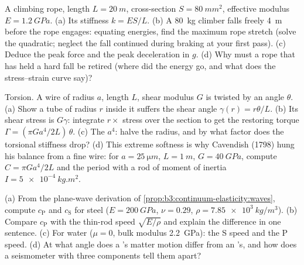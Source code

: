 \begin{exercise}[$\star\star$]\label{exo:b3:continuum-elasticity:7}
A climbing rope, length $L = \qty{20}{m}$, cross-section $S =
\qty{80}{mm^2}$, effective modulus $E = \qty{1.2}{GPa}$. (a) Its
stiffness $k = ES/L$. (b) A \qty{80}{kg} climber falls freely
\qty{4}{m} before the rope engages: equating energies, find the
maximum rope stretch (solve the quadratic; neglect the fall continued
during braking at your first pass). (c) Deduce the peak force and the
peak deceleration in $g$. (d) Why must a rope that has held a hard
fall be retired (where did the energy go, and what does the
stress--strain curve say)?
\end{exercise}

\begin{exercise}[$\star\star$]\label{exo:b3:continuum-elasticity:8}
Torsion. A wire of radius $a$, length $L$, shear modulus $G$ is
twisted by an angle $\theta$. (a) Show a tube of radius $r$ inside it
suffers the shear angle $\gamma(r) = r\theta/L$. (b) Its shear stress
is $G\gamma$: integrate $r \times$ stress over the section to get the
restoring torque $\Gamma = (\pi Ga^4/2L)\,\theta$. (c) The $a^4$:
halve the radius, and by what factor does the torsional stiffness
drop? (d) This extreme softness is why Cavendish (1798) hung his
balance from a fine wire: for $a = \qty{25}{\micro m}$, $L =
\qty{1}{m}$, $G = \qty{40}{GPa}$, compute $C = \pi Ga^4/2L$ and the
period with a rod of moment of inertia $I = \qty{5e-4}{kg.m^2}$.
\end{exercise}

\begin{exercise}[$\star\star$]\label{exo:b3:continuum-elasticity:9}
(a) From the plane-wave derivation of
\cref{prop:b3:continuum-elasticity:waves}, compute $c_{\text{P}}$ and
$c_{\text{S}}$ for steel ($E = \qty{200}{GPa}$, $\nu = 0.29$, $\rho =
\qty{7.85e3}{kg/m^3}$). (b) Compare $c_{\text{P}}$ with the thin-rod
speed $\sqrt{E/\rho}$ and explain the difference in one sentence. (c)
For water ($\mu = 0$, bulk modulus \qty{2.2}{GPa}): the S speed and
the P speed. (d) At what angle does a 's matter motion differ
from an 's, and how does a seismometer with three components
tell them apart?
\end{exercise}

